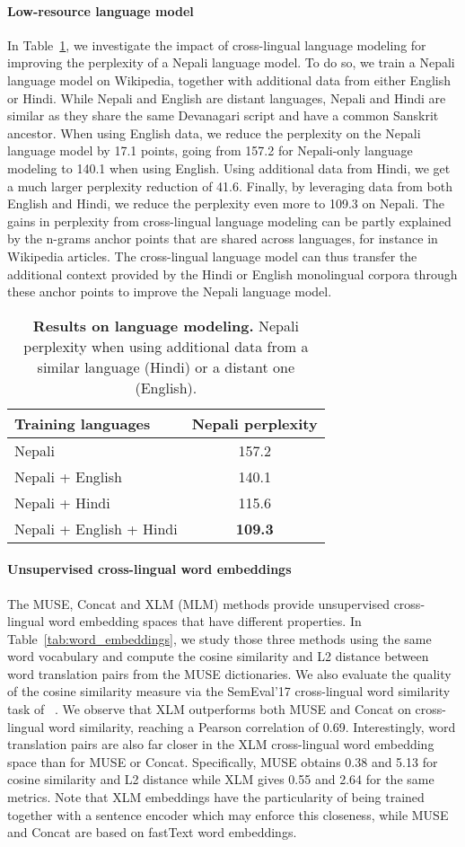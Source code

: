 \documentclass[11pt,a4paper]{article}
\newcommand{\insertLMtable}{
    \begin{table}[t!]
        \centering
\begin{tabular}[b]{l|c}
        \toprule
            Training languages       & Nepali perplexity \\
            \midrule
            Nepali                   & 157.2 \\
            Nepali + English         & 140.1 \\
            Nepali + Hindi           & 115.6 \\
            Nepali + English + Hindi & \textbf{109.3} \\
            \bottomrule
        \end{tabular}
        \caption{\textbf{Results on language modeling.} Nepali perplexity when using additional data from a similar language (Hindi) or a distant one (English).
        \label{tab:LMtable}}
       \vspace{-0.4cm}
    \end{table}
}
\begin{document}
\paragraph{Low-resource language model}
In Table~\ref{tab:LMtable}, we investigate the impact of cross-lingual language modeling for improving the perplexity of a Nepali language model. To do so, we train a Nepali language model on Wikipedia, together with additional data from either English or Hindi. While Nepali and English are distant languages, Nepali and Hindi are similar as they share the same Devanagari script and have a common Sanskrit ancestor. 
When using English data, we reduce the perplexity on the Nepali language model by 17.1 points, going from 157.2 for Nepali-only language modeling to 140.1 when using English. Using additional data from Hindi, we get a much larger perplexity reduction of 41.6. Finally, by leveraging data from both English and Hindi, we reduce the perplexity even more to 109.3 on Nepali. The gains in perplexity from cross-lingual language modeling can be partly explained by the n-grams anchor points that are shared across languages, for instance in Wikipedia articles. The cross-lingual language model can thus transfer the additional context provided by the Hindi or English monolingual corpora through these anchor points to improve the Nepali language model.
\insertLMtable


\paragraph{Unsupervised cross-lingual word embeddings}
The MUSE, Concat and XLM (MLM) methods provide unsupervised cross-lingual word embedding spaces that have different properties. In Table~\ref{tab:word_embeddings}, we study those three methods using the same word vocabulary and compute the cosine similarity and L2 distance between word translation pairs from the MUSE dictionaries. We also evaluate the quality of the cosine similarity measure via the SemEval'17 cross-lingual word similarity task of ~\citet{camacho2017semeval}. We observe that XLM outperforms both MUSE and Concat on cross-lingual word similarity, reaching a Pearson correlation of 0.69. Interestingly, word translation pairs are also far closer in the XLM cross-lingual word embedding space than for MUSE or Concat. Specifically, MUSE obtains 0.38 and 5.13 for cosine similarity and L2 distance while XLM gives 0.55 and 2.64 for the same metrics. Note that XLM embeddings have the particularity of being trained together with a sentence encoder which may enforce this closeness, while MUSE and Concat are based on fastText word embeddings.
\end{document}
